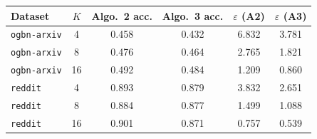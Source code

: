 \begin{tabular}{lccccc}
\toprule
Dataset & $K$ & Algo.~2 acc. & Algo.~3 acc. & $\varepsilon$ (A2) & $\varepsilon$ (A3) \\
\midrule
\texttt{ogbn-arxiv} & 4 & 0.458 & 0.432 & 6.832 & 3.781 \\
\texttt{ogbn-arxiv} & 8 & 0.476 & 0.464 & 2.765 & 1.821 \\
\texttt{ogbn-arxiv} & 16 & 0.492 & 0.484 & 1.209 & 0.860 \\
\texttt{reddit} & 4 & 0.893 & 0.879 & 3.832 & 2.651 \\
\texttt{reddit} & 8 & 0.884 & 0.877 & 1.499 & 1.088 \\
\texttt{reddit} & 16 & 0.901 & 0.871 & 0.757 & 0.539 \\
\bottomrule
\end{tabular}
